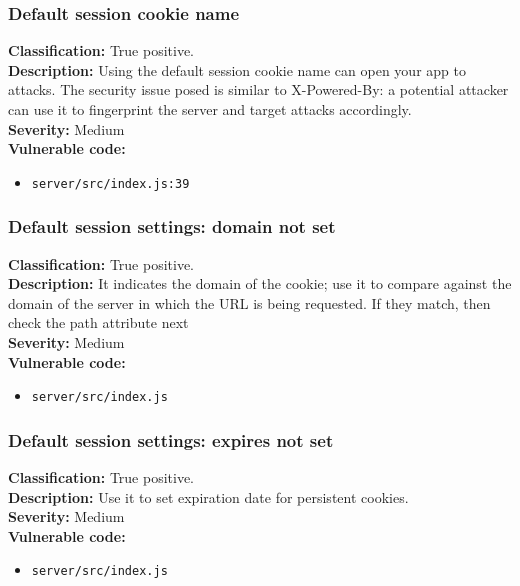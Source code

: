 \documentclass[]{article}
\begin{document}
\subsubsection{Default session cookie name}
\textbf{Classification:} {True positive.} \\
\textbf{Description:} Using the default session cookie name can open your app to
          attacks. The security issue posed is similar to X-Powered-By: a potential attacker can use it to    
          fingerprint the server and target attacks accordingly. \\ 
\textbf{Severity:}  Medium \\ 
\textbf{Vulnerable code:}
\begin{itemize}
    \item \texttt{server/src/index.js:39}
\end{itemize}


\subsubsection{Default session settings: domain not set}
\textbf{Classification:} {True positive.} \\
\textbf{Description:} It indicates the domain of the cookie; use it
          to compare against the domain of the server in which the URL is being requested. If they match, then
          check the path attribute next \\ 
\textbf{Severity:}  Medium \\ 
\textbf{Vulnerable code:}
\begin{itemize}
    \item \texttt{server/src/index.js}
\end{itemize}

\subsubsection{Default session settings: expires not set}
\textbf{Classification:} {True positive.} \\
\textbf{Description:} Use it to set expiration date for persistent cookies. \\
\textbf{Severity:}  Medium\\ 
\textbf{Vulnerable code:}
\begin{itemize}
    \item \texttt{server/src/index.js}
\end{itemize}
\end{document}
